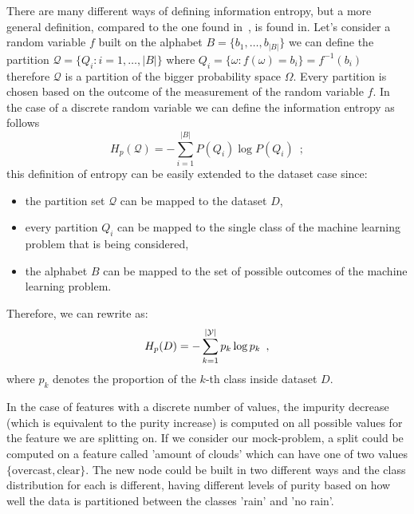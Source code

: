 There are many different ways of defining information entropy, but a more general definition, compared
to the one found in~\cite{ZhouZhi-Hua2021ML}, is found in. Let's consider a
random variable $f$ built on the alphabet $B = \{b_1, \ldots, b_{|B|}\}$ we can define the
partition $\mathcal{Q} = \{Q_i: i = 1, \ldots, |B|\}$ where $Q_i = \{\omega: f(\omega) = b_i\} =
f^{-1}(b_i)$ therefore $\mathcal{Q}$ is a partition of the bigger probability space $\Omega$. Every
partition is chosen based on the outcome of the measurement of the random variable $f$. In the case
of a discrete random variable we can define the information entropy as follows
\begin{equation}
	\label{eq:information-entropy}
	H_p(\mathcal{Q}) = - \sum_{i = 1}^{|B|}{P(Q_i)\log{P(Q_i)}} \enspace;
\end{equation}
this definition of entropy can be easily extended to the dataset case since:
\begin{itemize}
	\item the partition set $\mathcal{Q}$ can be mapped to the dataset $D$,
	\item every partition $Q_i$ can be mapped to the single class of the machine learning
	      problem that is being considered,
	\item the alphabet $B$ can be mapped to the set of possible outcomes of the machine learning
	      problem.
\end{itemize}
Therefore, we can rewrite  as:
\begin{equation}
	H_p(D) = - \sum_{k = 1}^{|\mathcal{Y}|}p_k \log{p_k} \enspace,
\end{equation}
where $p_k$ denotes the proportion of the $k$-th class inside dataset $D$.

\smallskip

In the case of features with a discrete number of values, the impurity decrease (which is equivalent
to the purity increase) is computed on all possible values for the feature we are splitting on. If we consider our mock-problem, a split could be computed on a feature called 'amount of clouds' which can have one of two values $\{\text{overcast}, \text{clear}\}$. The new node could be built in two different ways and the class distribution for each is different, having different levels of purity based on how well the data is partitioned between the classes 'rain' and 'no rain'.

\smallskip

